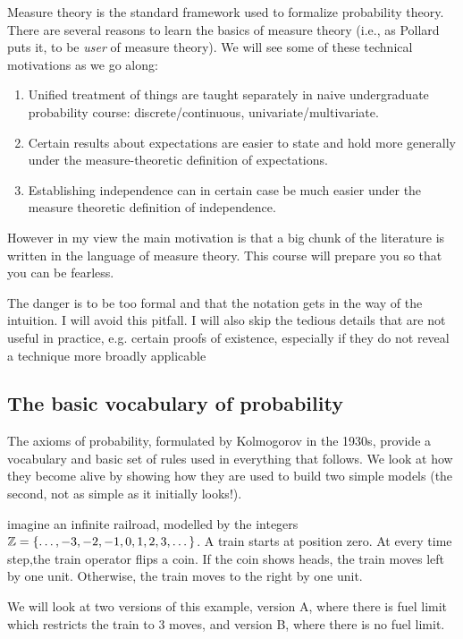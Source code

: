 \documentclass{article}
\begin{document}
 Measure theory is the standard framework used to formalize probability theory. There are several reasons to learn the basics of measure theory (i.e., as Pollard puts it, to be \emph{user} of measure theory). We will see some of these technical motivations as we go along: 
\begin{enumerate}
	\item Unified treatment of things are taught separately in naive undergraduate probability course: discrete/continuous, univariate/multivariate. 
	\item Certain results about expectations are easier to state and hold more generally under the measure-theoretic definition of expectations.
	\item Establishing independence can in certain case be much easier under the measure theoretic definition of independence.
\end{enumerate}
However in my view the main motivation is that a big chunk of the literature is written in the language of measure theory. This course will prepare you so that you can be fearless. 

The danger is to be too formal and that the notation gets in the way of the intuition. I will avoid this pitfall. I will also skip the tedious details that are not useful in practice, e.g. certain proofs of existence, especially if they do not reveal a technique more broadly applicable 


\subsection{The basic vocabulary of probability}

The axioms of probability, formulated by Kolmogorov in the 1930s, provide a vocabulary and basic set of rules used in everything that follows. We look at how they become alive by showing how they are used to build two simple models (the second, not as simple as it initially looks!).

 imagine an infinite railroad, modelled by the integers ${\mathbb Z} = \{\dots, -3, -2, -1, 0, 1, 2, 3, \dots\}$. A train starts at position zero. At every time step,the train operator flips a coin. If the coin shows heads, the train moves left by one unit. Otherwise, the train moves to the right by one unit. 

We will look at two versions of this example, version A, where there is fuel limit which restricts the train to 3 moves, and version B, where there is no fuel limit. 
\end{document}
